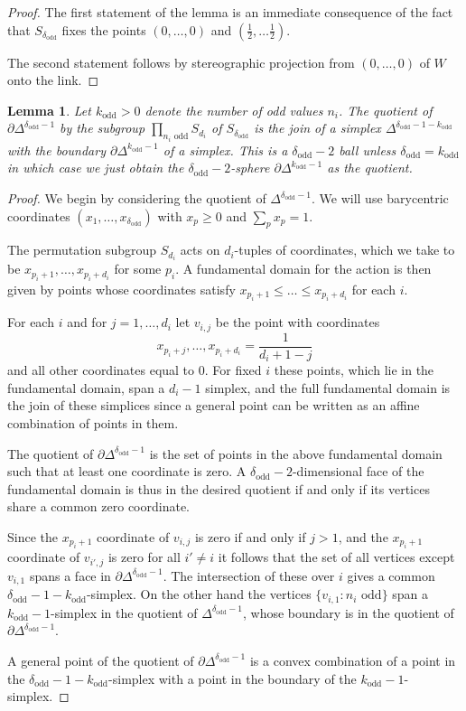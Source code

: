 \documentclass[11pt,a4paper]{article}
\newtheorem{lemma}[theorem]{Lemma}
\def\odd{\mathrm{odd}}
\begin{document}
\begin{proof}
    The first statement of the lemma is an immediate consequence of the fact that $S_{\delta_\odd}$ fixes the points $(0,\dots,0)$ and $(\frac  12,\dots\frac 12)$.

    The second statement follows by stereographic projection from $(0,\dots,0)$ of $W$ onto the link.
\end{proof}

\begin{lemma}\label{join lemma}
    Let $k_\odd>0$ denote the number of odd values $n_i$. The quotient of $\partial\Delta^{{\delta_\odd}-1}$ by the subgroup $\prod_{n_i \text{ odd}} S_{d_i}$ of $S_{\delta_\odd}$ is the join of a simplex $\Delta^{{\delta_\odd}-1-k_\odd}$  with the boundary $\partial\Delta^{k_\odd-1}$ of a simplex. This is a ${\delta_\odd}-2$ ball unless ${\delta_\odd}=k_\odd$ in which case we just obtain the ${\delta_\odd}-2$-sphere $\partial\Delta^{k_\odd-1}$ as the quotient.
\end{lemma}

\begin{proof}
    We begin by considering the quotient of $\Delta^{{\delta_\odd}-1}$. We will use barycentric coordinates $(x_1,\dots,x_{\delta_\odd})$ with $x_p\geq0$ and $\sum_px_p=1$.
    
    The permutation subgroup $S_{d_i}$ acts on $d_i$-tuples of coordinates, which we take to be $x_{p_i+1},\dots,x_{p_i+d_i}$ for some $p_i$. A fundamental domain for the action is then given by points whose coordinates satisfy $x_{p_i+1}\leq\dots\leq x_{p_i+d_i}$ for each $i$.

    For each $i$ and for $j=1,\dots,d_i$ let $v_{i,j}$ be the point with coordinates
    \[
    x_{p_i+j},\dots,x_{p_i+d_i}=\frac{1}{d_i+1-j}\]
    and all other coordinates equal to $0$. For  fixed  $i$ these points, which lie in the fundamental domain, span a $d_i-1$ simplex, and the full fundamental domain is the join of these simplices since a general point can be written as an affine combination of points in them.

    The quotient of $\partial \Delta^{{\delta_\odd}-1}$ is the set of points in the above fundamental domain such that at least one coordinate is zero. A ${\delta_\odd}-2$-dimensional face of the fundamental domain is thus in the desired quotient if and only if its vertices share a common zero coordinate.
    
    Since the $x_{p_i+1}$ coordinate of $v_{i,j}$ is zero if and only if $j>1$, and the $x_{p_i+1}$ coordinate of $v_{i',j}$ is zero for all $i'\neq i$ it follows that the set of all vertices except $v_{i,1}$ spans a face in $\partial \Delta^{{\delta_\odd}-1}$. The intersection of these over $i$ gives a common ${\delta_\odd}-1-k_\odd$-simplex. On the other hand the vertices $\{v_{i,1} : n_i \text{ odd}\}$ span a $k_\odd-1$-simplex in the quotient of $\Delta^{{\delta_\odd}-1}$, whose boundary is in the quotient of $\partial\Delta^{{\delta_\odd}-1}$.

    A general point of the quotient of $\partial\Delta^{{\delta_\odd}-1}$ is a convex combination of a point in the ${\delta_\odd}-1-k_\odd$-simplex with a point in the boundary of the $k_\odd-1$-simplex.
\end{proof}
\end{document}
